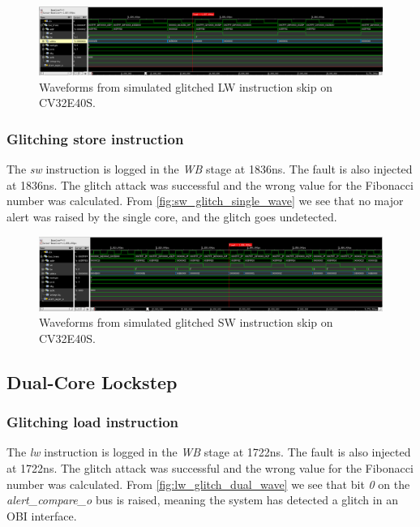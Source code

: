 \begin{figure}[h!]
    \centering
    \includegraphics[width=\textwidth]{docs/images/lw_glitch_single_core.png}
    \caption{Waveforms from simulated glitched LW instruction skip on CV32E40S.}
    \label{fig:lw_glitch_single_wave}
\end{figure}

\subsubsection{Glitching store instruction}

The \textit{sw} instruction is logged in the \textit{WB} stage at 1836ns. The fault is also injected at 1836ns. The glitch attack was successful and the wrong value for the Fibonacci number was calculated. From \autoref{fig:sw_glitch_single_wave} we see that no major alert was raised by the single core, and the glitch goes undetected. 

\begin{figure}[h!]
    \centering
    \includegraphics[width=\textwidth]{docs/images/sw_glitch_single_core.png}
    \caption{Waveforms from simulated glitched SW instruction skip on CV32E40S.}
    \label{fig:sw_glitch_single_wave}
\end{figure}


\subsection{Dual-Core Lockstep}

\subsubsection{Glitching load instruction}

The \textit{lw} instruction is logged in the \textit{WB} stage at 1722ns. The fault is also injected at 1722ns. The glitch attack was successful and the wrong value for the Fibonacci number was calculated. From \autoref{fig:lw_glitch_dual_wave} we see that bit \textit{0} on the \textit{alert\_compare\_o} bus is raised, meaning the system has detected a glitch in an OBI interface. 

